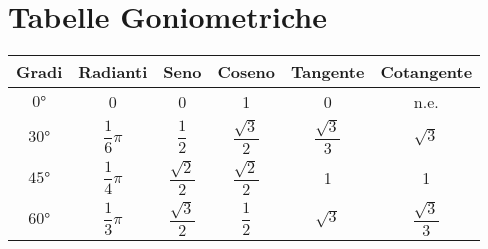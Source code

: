 \chapter{Tabelle Goniometriche}
\label{cha:TabelleGoniometriche}
\minitoc
\mtcskip                                %
\minilof                                %
\mtcskip                                %
\minilot
\begin{table}[H]
	\centering
	\renewcommand{\arraystretch}{3}
	\begin{tabular}{cccccc}
		\toprule
		Gradi & Radianti & Seno & Coseno & Tangente & Cotangente \\ [.25cm]
		\midrule
		$\ang{0}$ & 0 & 0 & 1 & 0 & n.e. \\ [.25cm] 
		\hline%
		$\ang{30}$&$\dfrac{1}{6}\pi$&$\dfrac{1}{2}$&$\dfrac{\sqrt{3}}{2}$&$\dfrac{\sqrt{3}}{3}$&$\sqrt{3}$\\ [.25cm]
		\hline%
		$\ang{45}$&$\dfrac{1}{4}\pi$&$\dfrac{\sqrt{2}}{2}$& $\dfrac{\sqrt{2}}{2}$ & 1 & 1 \\ [.4cm]
		\hline%
		$\ang{60}$&$\dfrac{1}{3}\pi$&$\dfrac{\sqrt{3}}{2}$&$\dfrac{1}{2}$&$\sqrt{3}$&$\dfrac{\sqrt{3}}{3}$\\ [.25cm]

\end{tabular}
\end{table}
